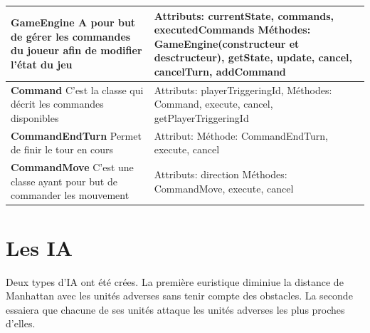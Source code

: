 \begin{tabularx}{15 cm}{|X|X|}
\hline
\textbf{GameEngine} \newline A pour but de gérer les commandes du joueur afin de modifier l'état du jeu & Attributs: currentState, commands, executedCommands \newline Méthodes: GameEngine(constructeur et desctructeur), getState, update, cancel, cancelTurn, addCommand\\ 
\hline
\textbf{Command} \newline C'est la classe qui décrit les commandes disponibles  & Attributs: playerTriggeringId,  \newline Méthodes: Command, execute, cancel, getPlayerTriggeringId\\
\hline
\textbf{CommandEndTurn} \newline Permet de finir le tour en cours & Attribut:  \newline Méthode: CommandEndTurn, execute, cancel\\
\hline
\textbf{CommandMove} \newline C'est une classe ayant pour but de commander les mouvement & Attributs: direction
\newline Méthodes: CommandMove, execute, cancel\\
\hline

\end{tabularx}

\newpage



\section{Les IA}

Deux types d'IA ont été crées.
La première euristique diminiue la distance de Manhattan avec les unités adverses sans tenir compte des obstacles.
La seconde essaiera que chacune de ses unités attaque les unités adverses les plus proches d'elles. 



